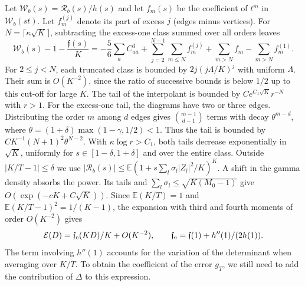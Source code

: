 Let $\mathcal W_b(s)=\mathcal R_b(s)/h(s)$ and let $f_m(s)$ be the coefficient of $t^m$ in
$\mathcal W_b(st)$. Let $f_m^{(j)}$ denote its part of excess $j$ (edges minus vertices). For
$N=\lceil\kappa\sqrt K\rceil$, subtracting the excess-one class summed over all orders leaves
\[
 \mathcal W_b(s)-1-\frac{\mathfrak f(s)}K
 =-\frac56\sum_a C_{aa}^3+\sum_{j=2}^{N-1}\sum_{m\le N}f_m^{(j)}
   +\sum_{m>N}f_m-\sum_{m>N}f_m^{(1)} .
\]
For $2\le j<N$, each truncated class is bounded by $2j(j\Lambda/K)^j$ with uniform $\Lambda$.
Their sum is $O(K^{-2})$, since the ratio of successive bounds is below $1/2$ up to this cut-off
for large $K$. The tail of the interpolant is bounded by $C e^{C_1\sqrt K}r^{-N}$ with $r>1$. For
the excess-one tail, the diagrams have two or three edges. Distributing the order $m$ among $d$
edges gives $\binom{m-1}{d-1}$ terms with decay $\theta^{m-d}$, where
$\theta=(1+\delta)\max(1-\gamma,1/2)<1$. Thus the tail is bounded by $C
K^{-1}(N+1)^2\theta^{N-2}$. With $\kappa\log r>C_1$, both tails decrease exponentially in $\sqrt
K$, uniformly for $s\in[1-\delta,1+\delta]$ and over the entire class. Outside $|K/T-1|\le\delta$
we use $|\mathcal R_b(s)|\le\mathbb E(1+s\sum_l\sigma_l|Z_l|^2/K)^K$. A shift in the gamma density
absorbs the power. Its tails and $\sum_l\sigma_l\le\sqrt{K(M_0-1)}$ give $O(\exp(-cK+C\sqrt K))$.
Since $\mathbb E(K/T)=1$ and $\mathbb E(K/T-1)^2=1/(K-1)$, the expansion with third and fourth
moments of order $O(K^{-2})$ gives
\[
 \mathcal E(D)=\mathfrak f_{\rm e}(KD)/K+O(K^{-2}),\qquad
 \mathfrak f_{\rm e}=\mathfrak f(1)+h''(1)/(2h(1)).
\]
The term involving $h''(1)$ accounts for the variation of the determinant when averaging over
$K/T$. To obtain the coefficient of the error $g_T$, we still need to add the contribution of
$\Delta$ to this expression.






